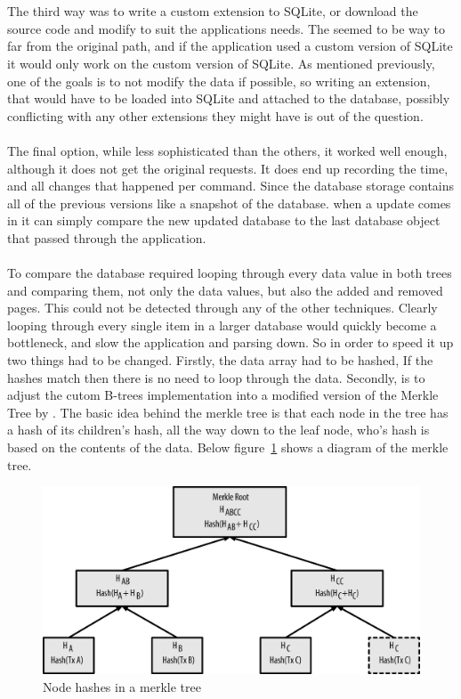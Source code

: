 \\\\
The third way was to write a custom extension to SQLite, or download the source code and modify to suit the applications needs. The seemed to be way to far from the original path, and if the application used a custom version of SQLite it would only work on the custom version of SQLite. As mentioned previously, one of the goals is to not modify the data if possible, so writing an extension, that would have to be loaded into SQLite and attached to the database, possibly conflicting with any other extensions they might have is out of the question.
\\\\
The final option, while less sophisticated than the others, it worked well enough, although it does not get the original requests. It does end up recording the time, and all changes that happened per command. Since the database storage contains all of the previous versions like a snapshot of the database. when a update comes in it can simply compare the new updated database to the last database object that passed through the application.
\\\\
To compare the database required looping through every data value in both trees and comparing them, not only the data values, but also the added and removed pages. This could not be detected through any of the other techniques. Clearly looping through every single item in a larger database would quickly become a bottleneck, and slow the application and parsing down. So in order to speed it up two things had to be changed. Firstly, the data array had to be hashed, If the hashes match then there is no need to loop through the data. Secondly, is to adjust the cutom B-trees implementation into a modified version of the Merkle Tree by \cite{merkletree}. The basic idea behind the merkle tree is that each node in the tree has a hash of its children’s hash, all the way down to the leaf node, who's hash is based on the contents of the data. Below figure~\ref{fig:merkle_tree} shows a diagram of the merkle tree.

\begin{figure}[H]
	\centering
	\includegraphics[scale=1.0]{images/merkle_tree.png}
	\caption{Node hashes in a  merkle tree \citep{bitcoin}}
	\label{fig:merkle_tree}
\end{figure}

